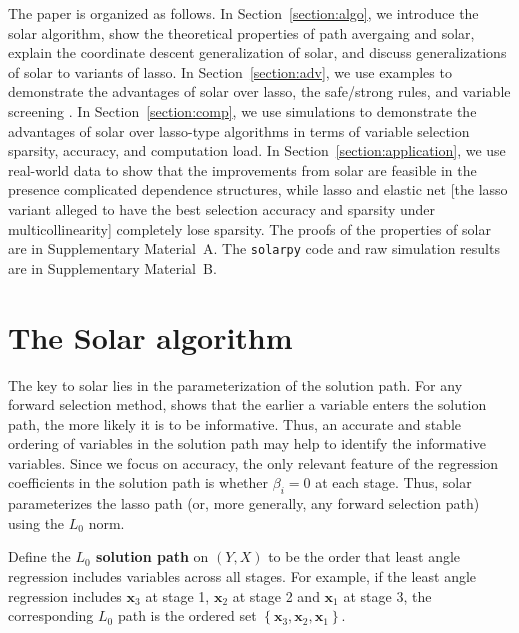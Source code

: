 \documentclass[11pt,review,authoryear]{elsarticle}
\begin{document}
The paper is organized as follows. In Section~\ref{section:algo}, we introduce the solar algorithm, show the theoretical properties of path avergaing and solar, explain the coordinate descent generalization of solar, and discuss generalizations of solar to variants of lasso. In Section~\ref{section:adv}, we use examples to demonstrate the advantages of solar over lasso, the safe/strong rules, and variable screening . In Section~\ref{section:comp}, we use simulations to demonstrate the advantages of solar over lasso-type algorithms in terms of variable selection sparsity, accuracy, and computation load. In Section~\ref{section:application}, we use real-world data to show that the improvements from solar are feasible in the presence complicated dependence structures, while lasso and elastic net [the lasso variant alleged \citep{zou2005regularization, jia2010model} to have the best selection accuracy and sparsity under multicollinearity] completely lose sparsity. The proofs of the properties of solar are in Supplementary Material~A. The \texttt{solarpy} code and raw simulation results are in Supplementary Material~B.


\section{The Solar algorithm \label{section:algo}}

The key to solar lies in the parameterization of the solution path. For any forward selection method, \citet[Theorem~2]{zhang09} shows that the earlier a variable enters the solution path, the more likely it is to be informative. Thus, an accurate and stable ordering of variables in the solution path may help to identify the informative variables. Since we focus on accuracy, the only relevant feature of the regression coefficients in the solution path is whether $\beta_i = 0$ at each stage. Thus, solar parameterizes the lasso path (or, more generally, any forward selection path) using the $L_0$ norm.
%
\begin{definition}
  Define the \textbf{$L_0$ solution path} on $\left( Y, X \right)$ to be the order that least angle regression includes variables across all stages. For example, if the least angle regression includes $\mathbf{x}_3$ at stage 1, $\mathbf{x}_2$ at stage 2 and $\mathbf{x}_1$ at stage 3, the corresponding $L_0$ path is the ordered set $\left\{ \mathbf{x}_3, \mathbf{x}_2, \mathbf{x}_1 \right\}$.
  \label{def:solution_path}
\end{definition}
\end{document}
